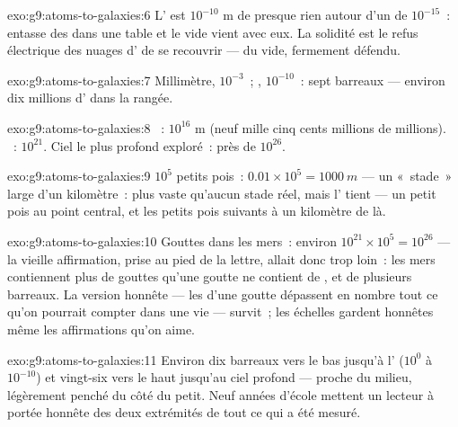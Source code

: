 \begin{solution}{exo:g9:atoms-to-galaxies:6}
L' est $10^{-10}$ \unit{m} de presque rien autour d'un  de
$10^{-15}$~: entasse des  dans une table et le vide vient avec
eux. La solidité est le refus électrique des nuages d' de se
recouvrir --- du vide, fermement défendu.
\end{solution}

\begin{solution}{exo:g9:atoms-to-galaxies:7}
Millimètre, $10^{-3}$~; , $10^{-10}$~: sept barreaux --- environ
dix millions d' dans la rangée.
\end{solution}

\begin{solution}{exo:g9:atoms-to-galaxies:8}
~: $10^{16}$ \unit{m} (neuf mille cinq cents millions de
millions). ~: $10^{21}$. Ciel le plus profond exploré~:
près de $10^{26}$.
\end{solution}

\begin{solution}{exo:g9:atoms-to-galaxies:9}
$10^{5}$ petits pois~: $0.01 \times 10^{5} = \qty{1000}{m}$ --- un
«~stade~» large d'un kilomètre~: plus vaste qu'aucun stade réel, mais
l' tient --- un petit pois au point central, et les petits pois
suivants à un kilomètre de là.
\end{solution}

\begin{solution}{exo:g9:atoms-to-galaxies:10}
Gouttes dans les mers~: environ $10^{21} \times 10^{5} = 10^{26}$ ---
la vieille affirmation, prise au pied de la lettre, allait donc trop
loin~: les mers contiennent plus de gouttes qu'une goutte ne contient
de , et de plusieurs barreaux. La version honnête --- les
 d'une goutte dépassent en nombre tout ce qu'on pourrait
compter dans une vie --- survit~; les échelles gardent honnêtes même
les affirmations qu'on aime.
\end{solution}

\begin{solution}{exo:g9:atoms-to-galaxies:11}
Environ dix barreaux vers le bas jusqu'à l' ($10^{0}$ à
$10^{-10}$) et vingt-six vers le haut jusqu'au ciel profond ---
proche du milieu, légèrement penché du côté du petit. Neuf années
d'école mettent un lecteur à portée honnête des deux extrémités de
tout ce qui a été mesuré.
\end{solution}

